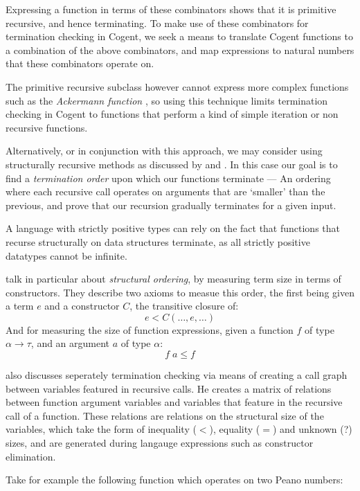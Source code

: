 Expressing a function in terms of these combinators shows that it is primitive recursive,
and hence terminating. To make use of these combinators for termination checking 
in Cogent, we seek a means to translate Cogent functions to a combination of the above
combinators, and map expressions to natural numbers that these combinators operate on.

The primitive recursive subclass however cannot express more complex functions such
as the \textit{Ackermann function} \citep{Ackermann}, so using this technique limits
termination checking in Cogent to functions that perform a kind of simple iteration or
non recursive functions.

Alternatively, or in conjunction with this approach, we may consider using
structurally recursive methods as discussed by \citet{StrucrecStructures} and
\citet{PredicateStructrec}. In this case our goal is to find a
\textit{termination order} upon which our functions terminate --- An ordering
where each recursive call operates on arguments that are `smaller' than the
previous, and prove that our recursion gradually terminates for a given input. 

A language with strictly positive types can rely on the fact that functions that
recurse structurally on data structures terminate, as all strictly positive datatypes
cannot be infinite.

\citet{PredicateStructrec} talk in particular about \textit{structural ordering}, 
by measuring term size in terms of constructors. They describe two axioms to measue
this order, the first being given a term $e$ and a constructor $C$, the transitive closure of:
$$
    e < C (\dots, e, \dots)
$$
And for measuring the size of function expressions, given a function $f$ of 
type $\alpha \longrightarrow \tau$, and an argument $a$ of type $\alpha$:
$$
    f\; a \leq f
$$

\citet{Foetus} also discusses seperately termination checking via means of
creating a call graph between variables featured in recursive calls. He creates
a matrix of relations between function argument variables and variables that
feature in the recursive call of a function. These relations are relations
on the structural size of the variables, which take the form of inequality ($<$),
equality ($=$) and unknown (\textsf{?}) sizes, and are generated during
langauge expressions such as constructor elimination. 

Take for example the following function which operates on two Peano numbers:

